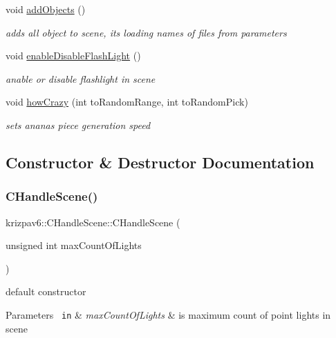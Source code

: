\begin{DoxyCompactItemize}
void \mbox{\hyperlink{classkrizpav6_1_1_c_handle_scene_a87b33beb89fe21fd30137fe007f0d548}{add\+Objects}} ()
\begin{DoxyCompactList}\small\item\em adds all object to scene, its loading names of files from parameters \end{DoxyCompactList}\item 
void \mbox{\hyperlink{classkrizpav6_1_1_c_handle_scene_a2fecb69c6723b074882549ccab4d4b6b}{enable\+Disable\+Flash\+Light}} ()
\begin{DoxyCompactList}\small\item\em anable or disable flashlight in scene \end{DoxyCompactList}\item 
void \mbox{\hyperlink{classkrizpav6_1_1_c_handle_scene_ae9e5664c11a575e1400c7d1754249882}{how\+Crazy}} (int to\+Random\+Range, int to\+Random\+Pick)
\begin{DoxyCompactList}\small\item\em sets ananas piece generation speed \end{DoxyCompactList}\end{DoxyCompactItemize}


\subsection{Constructor \& Destructor Documentation}
\mbox{\label{classkrizpav6_1_1_c_handle_scene_a06e81656b1f20abc13ac55ff4acc3df3}} 
\subsubsection{\texorpdfstring{CHandleScene()}{CHandleScene()}}
{\footnotesize\ttfamily krizpav6\+::\+C\+Handle\+Scene\+::\+C\+Handle\+Scene (\begin{DoxyParamCaption}\item[{unsigned int}]{max\+Count\+Of\+Lights }\end{DoxyParamCaption})}



default constructor 


\begin{DoxyParams}[1]{Parameters}
\mbox{\texttt{ in}}  & {\em max\+Count\+Of\+Lights} & is maximum count of point lights in scene \\
\hline
\end{DoxyParams}
\mbox{\label{classkrizpav6_1_1_c_handle_scene_ab18680142307462378964ca9ece4917f}} 
